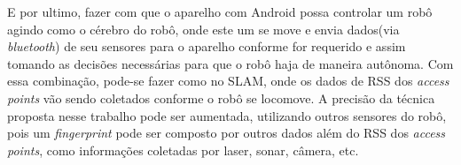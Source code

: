   E por ultimo, fazer com que o aparelho com Android possa controlar 
  um robô agindo como o cérebro do robô, onde este um
  se move e envia dados(via \textit{bluetooth}) de seu sensores para o aparelho conforme for 
  requerido e assim tomando as decisões necessárias para
  que o robô haja de maneira autônoma. Com essa combinação, pode-se fazer como no SLAM, 
  onde os dados de RSS dos \textit{access points} vão sendo coletados conforme o robô se locomove.
  A precisão da técnica proposta nesse trabalho pode ser aumentada, utilizando 
  outros sensores do robô, pois um \textit{fingerprint} pode ser composto por outros dados
   além do RSS dos \textit{access points}, como informações coletadas por laser, sonar, câmera, etc.
\begin{comment}
    As possibilidades de trabalhos futuros são enormes. Primeiro poderia implantar o modelo de propagação
de sinal, proposto no artigo \cite{wifiRadar}. Nele são levados em consideração
diversas variáveis para sua elaboração, sendo que a mais importante delas é a quantidade de obstáculos que estão 
entre o transmissor de sinal (Access Point) e o receptor (terminal móvel).
Com base nesse parâmetro, uma equação da distância em função da força de sinal recebido
poderá ser deduzida, que será útil para os cálculos da posição e rastreamento
do terminal móvel. Ou ainda combinar técnicas baseadas em RSS com as tecnologias já largamente empregadas, tais como o GPS.
    
    
    Poderia também, ao contrário do sistema proposto, tratar a possibilidade de não haver um mapa do ambiente, e utilizar técnicas que lidam com o SLAM, 
    como nos artigos \cite{construcaoMapas2}\cite{construcaoMapas}\cite{slam}. E utilizar um algoritmo de planejamento de trajetos mais robusto 
    como o proposto em \cite{voronoi}, que utiliza diagrama de Voronoi para criar um \textit{roadmap}. E ainda ao invés de usar um simples sonar para detectar
     obstáculos, utilizar a câmera do tablet.
     
     Podemos aumentar a escala e ao invés de utilizar um simples robô de 40 cm dentro de um prédio, utilizar o sistema de navegação em um carro, 
      em um ambiente maior \cite{googleCar}.
\end{comment}
